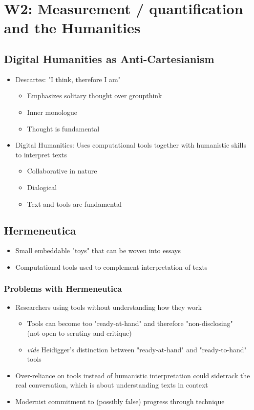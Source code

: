 \documentclass[a4paper]{article}
\begin{document}
\newpage
\section{W2: Measurement / quantification and the Humanities}
\subsection{Digital Humanities as Anti-Cartesianism}
\begin{itemize}
    \item Descartes: "I think, therefore I am"
    \begin{itemize}[label=$\circ$]
        \item Emphasizes solitary thought over groupthink
        \item Inner monologue
        \item Thought is fundamental
    \end{itemize}
    \item Digital Humanities: Uses computational tools together with humanistic skills to interpret texts
    \begin{itemize}[label=$\circ$]
        \item Collaborative in nature
        \item Dialogical
        \item Text and tools are fundamental
    \end{itemize}
\end{itemize}

\subsection{Hermeneutica}
\begin{itemize}
    \item Small embeddable "toys" that can be woven into essays
    \item Computational tools used to complement interpretation of texts
\end{itemize}
\subsubsection{Problems with Hermeneutica}
\begin{itemize}
    \item Researchers using tools without understanding how they work
    \begin{itemize}[label=$\circ$]
        \item Tools can become too "ready-at-hand" and therefore "non-disclosing"\\(not open to scrutiny and critique)
        \item \textit{vide} Heidigger's distinction between "ready-at-hand" and "ready-to-hand" tools
    \end{itemize}
    \item Over-reliance on tools instead of humanistic interpretation could sidetrack the real conversation, which is about understanding texts in context
    \item Modernist commitment to (possibly false) progress through technique
\end{itemize}
\end{document}
